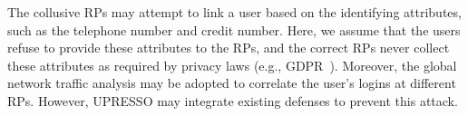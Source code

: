 The collusive RPs may attempt to link a user  based on the identifying attributes, such as the telephone number and credit number.
Here, we assume that the users refuse to provide these attributes to the RPs, and the correct RPs never collect these attributes as required by privacy laws (e.g., GDPR~\cite{wachter2017counterfactual}).
Moreover, the global network traffic analysis may be adopted to correlate the user's logins at different RPs.
  However, UPRESSO may integrate existing defenses to prevent this attack.





